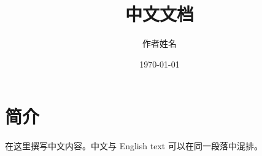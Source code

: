\documentclass[UTF8,11pt,a4paper]{ctexart}
\title{中文文档}
\author{作者姓名}
\date{\today}
\begin{document}
\maketitle
\section{简介}
在这里撰写中文内容。中文与 English text 可以在同一段落中混排。
\end{document}
